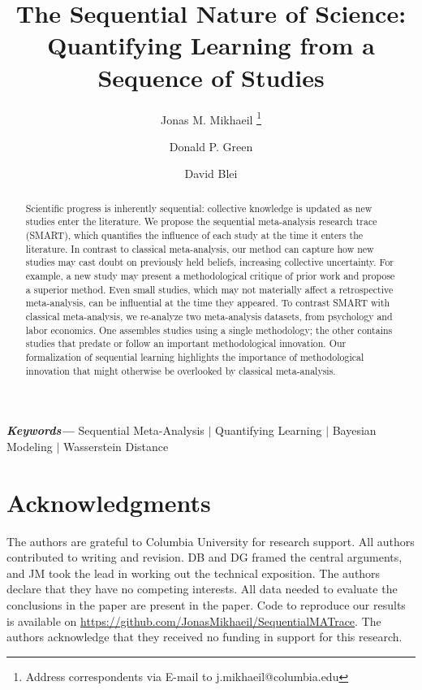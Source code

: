\documentclass[hidelinks]{article}
\title{The Sequential Nature of Science: \\
Quantifying Learning from a Sequence of Studies}
\author[a]{Jonas M. Mikhaeil \orcidlink{0000-0001-6745-7505}\thanks{Address correspondents via E-mail to j.mikhaeil@columbia.edu}}
\author[b]{Donald P. Green}
\author[a]{David Blei}
\affil[a]{Department of Statistics, Columbia University, 1255 Amsterdam Ave, New York, NY 10027}
\affil[b]{Department of Political Science, Columbia University, 420 W. 118th Street, New York, NY 10027}
\providecommand{\keywords}[1]
{
  \small	
  \textbf{\textit{Keywords---}} #1
}
\begin{document}
\maketitle

\begin{abstract}
Scientific progress is inherently sequential: collective knowledge is updated as new studies enter the literature. We propose the sequential meta-analysis research trace (SMART), which quantifies the influence of each study at the time it enters the literature. In contrast to classical meta-analysis, our method can capture how new studies may cast doubt on previously held beliefs, increasing collective uncertainty. For example, a new study may present a methodological critique of prior work and propose a superior method. Even small studies, which may not materially affect a retrospective meta-analysis, can be influential at the time they appeared. To contrast SMART with classical meta-analysis, we re-analyze two meta-analysis datasets, from psychology and labor economics. One assembles studies using a single methodology; the other contains studies that predate or follow an important methodological innovation. Our formalization of sequential learning highlights the importance of methodological innovation that might otherwise be overlooked by classical meta-analysis.
\end{abstract}
\keywords{Sequential Meta-Analysis $|$ Quantifying Learning $|$ Bayesian Modeling $|$ Wasserstein Distance}









\section*{Acknowledgments}
The authors are grateful to Columbia University for research support. All authors contributed to writing and revision.  DB and DG framed the central arguments, and JM took the lead in working out the technical exposition. 
The authors declare that they have no competing interests. All data needed to evaluate the conclusions in the paper are present in the paper. Code to reproduce our results is available on \href{https://github.com/JonasMikhaeil/SequentialMATrace}{https://github.com/JonasMikhaeil/SequentialMATrace}. The authors acknowledge that they received no funding in support for this research.
\newpage
\appendix

\end{document}
